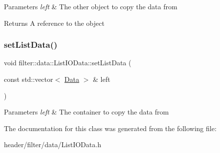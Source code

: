 \begin{DoxyParams}{Parameters}
{\em left} & The other object to copy the data from \\
\hline
\end{DoxyParams}
\begin{DoxyReturn}{Returns}
A reference to the object 
\end{DoxyReturn}
\mbox{\label{classfilter_1_1data_1_1_list_i_o_data_a62e1f9fff3f1310e75ed603681397ade}} 
\subsubsection{\texorpdfstring{set\+List\+Data()}{setListData()}}
{\footnotesize\ttfamily void filter\+::data\+::\+List\+I\+O\+Data\+::set\+List\+Data (\begin{DoxyParamCaption}\item[{const std\+::vector$<$ \hyperlink{classfilter_1_1data_1_1_data}{Data} $>$ \&}]{left }\end{DoxyParamCaption})\hspace{0.3cm}{\ttfamily [inline]}}


\begin{DoxyParams}{Parameters}
{\em left} & The container to copy the data from \\
\hline
\end{DoxyParams}


The documentation for this class was generated from the following file\+:\begin{DoxyCompactItemize}
\item 
header/filter/data/List\+I\+O\+Data.\+h\end{DoxyCompactItemize}
